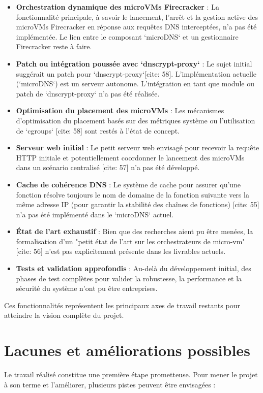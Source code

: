 \documentclass[12pt]{article}
\begin{document}
\begin{itemize}
    \item \textbf{Orchestration dynamique des microVMs Firecracker} : La fonctionnalité principale, à savoir le lancement, l'arrêt et la gestion active des microVMs Firecracker en réponse aux requêtes DNS interceptées, n'a pas été implémentée. Le lien entre le composant `microDNS` et un gestionnaire Firecracker reste à faire.
    \item \textbf{Patch ou intégration poussée avec `dnscrypt-proxy`} : Le sujet initial suggérait un patch pour `dnscrypt-proxy`[cite: 58]. L'implémentation actuelle (`microDNS`) est un serveur autonome. L'intégration en tant que module ou patch de `dnscrypt-proxy` n'a pas été réalisée.
    \item \textbf{Optimisation du placement des microVMs} : Les mécanismes d'optimisation du placement basés sur des métriques système ou l'utilisation de `cgroups` [cite: 58] sont restés à l'état de concept.
    \item \textbf{Serveur web initial} : Le petit serveur web envisagé pour recevoir la requête HTTP initiale et potentiellement coordonner le lancement des microVMs dans un scénario centralisé [cite: 57] n'a pas été développé.
    \item \textbf{Cache de cohérence DNS} : Le système de cache pour assurer qu'une fonction résolve toujours le nom de domaine de la fonction suivante vers la même adresse IP (pour garantir la stabilité des chaînes de fonctions) [cite: 55] n'a pas été implémenté dans le `microDNS` actuel.
    \item \textbf{État de l'art exhaustif} : Bien que des recherches aient pu être menées, la formalisation d'un "petit état de l'art sur les orchestrateurs de micro-vm" [cite: 56] n'est pas explicitement présente dans les livrables actuels.
    \item \textbf{Tests et validation approfondis} : Au-delà du développement initial, des phases de test complètes pour valider la robustesse, la performance et la sécurité du système n'ont pu être entreprises.
\end{itemize}
Ces fonctionnalités représentent les principaux axes de travail restants pour atteindre la vision complète du projet.

\section{Lacunes et améliorations possibles}
Le travail réalisé constitue une première étape prometteuse. Pour mener le projet à son terme et l'améliorer, plusieurs pistes peuvent être envisagées :
\end{document}
